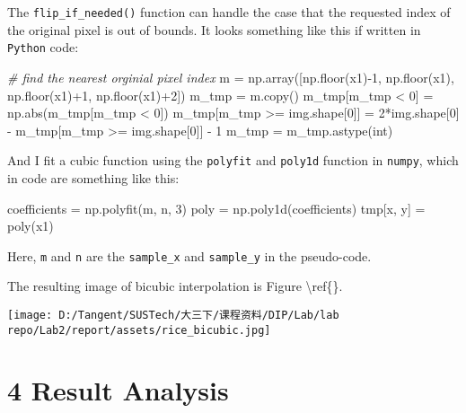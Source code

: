 \documentclass[
]{article}
\newenvironment{Shaded}{}{}
\newcommand{\BuiltInTok}[1]{\textcolor[rgb]{0.00,0.50,0.00}{#1}}
\newcommand{\CommentTok}[1]{\textcolor[rgb]{0.38,0.63,0.69}{\textit{#1}}}
\newcommand{\DecValTok}[1]{\textcolor[rgb]{0.25,0.63,0.44}{#1}}
\newcommand{\NormalTok}[1]{#1}
\newcommand{\OperatorTok}[1]{\textcolor[rgb]{0.40,0.40,0.40}{#1}}
\begin{document}
The \texttt{flip\_if\_needed()} function can handle the case that the
requested index of the original pixel is out of bounds. It looks
something like this if written in \texttt{Python} code:

\begin{Shaded}
\begin{Highlighting}[]
\CommentTok{\# find the nearest orginial pixel index}
\NormalTok{m }\OperatorTok{=}\NormalTok{ np.array([np.floor(x1)}\OperatorTok{{-}}\DecValTok{1}\NormalTok{, np.floor(x1), np.floor(x1)}\OperatorTok{+}\DecValTok{1}\NormalTok{, np.floor(x1)}\OperatorTok{+}\DecValTok{2}\NormalTok{])}
\NormalTok{m\_tmp }\OperatorTok{=}\NormalTok{ m.copy()}
\NormalTok{m\_tmp[m\_tmp }\OperatorTok{\textless{}} \DecValTok{0}\NormalTok{] }\OperatorTok{=}\NormalTok{ np.}\BuiltInTok{abs}\NormalTok{(m\_tmp[m\_tmp }\OperatorTok{\textless{}} \DecValTok{0}\NormalTok{])}
\NormalTok{m\_tmp[m\_tmp }\OperatorTok{\textgreater{}=}\NormalTok{ img.shape[}\DecValTok{0}\NormalTok{]] }\OperatorTok{=} \DecValTok{2}\OperatorTok{*}\NormalTok{img.shape[}\DecValTok{0}\NormalTok{] }\OperatorTok{{-}}\NormalTok{ m\_tmp[m\_tmp }\OperatorTok{\textgreater{}=}\NormalTok{ img.shape[}\DecValTok{0}\NormalTok{]] }\OperatorTok{{-}} \DecValTok{1}
\NormalTok{m\_tmp }\OperatorTok{=}\NormalTok{ m\_tmp.astype(}\BuiltInTok{int}\NormalTok{)}
\end{Highlighting}
\end{Shaded}

And I fit a cubic function using the \texttt{polyfit} and
\texttt{poly1d} function in \texttt{numpy}, which in code are something
like this:

\begin{Shaded}
\begin{Highlighting}[]
\NormalTok{coefficients }\OperatorTok{=}\NormalTok{ np.polyfit(m, n, }\DecValTok{3}\NormalTok{)}
\NormalTok{poly }\OperatorTok{=}\NormalTok{ np.poly1d(coefficients)}
\NormalTok{tmp[x, y] }\OperatorTok{=}\NormalTok{ poly(x1)}
\end{Highlighting}
\end{Shaded}

Here, \texttt{m} and \texttt{n} are the \texttt{sample\_x} and
\texttt{sample\_y} in the pseudo-code.

The resulting image of bicubic interpolation is Figure
\textbackslash ref\{\}.

\texttt{[image: D:/Tangent/SUSTech/大三下/课程资料/DIP/Lab/lab repo/Lab2/report/assets/rice\_bicubic.jpg]}

\hypertarget{4-result-analysis}{%
\section{4 Result Analysis}\label{4-result-analysis}}
\end{document}
